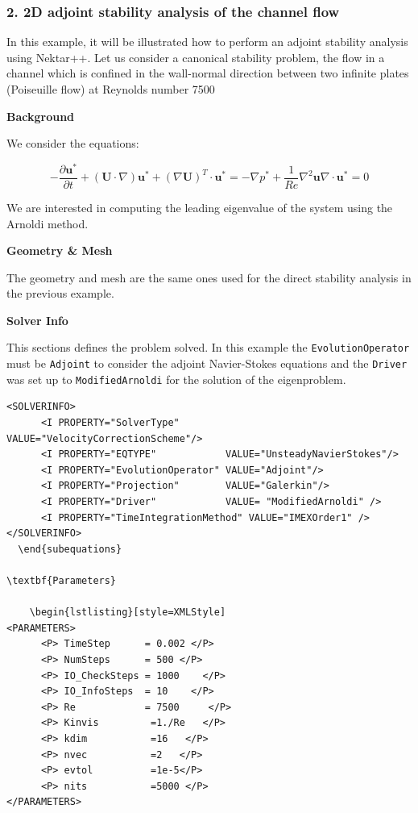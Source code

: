  \subsubsection{2. 2D adjoint stability analysis of the channel flow}

 In this example, it will be illustrated how to perform an adjoint stability analysis using Nektar++. Let us consider a canonical stability problem, the flow in a channel which is confined in the wall-normal direction between two infinite plates (Poiseuille flow) at Reynolds number 7500
 
 \textbf{Background}
 
  We consider the equations: 
  
  \begin{subequations}
  \begin{equation}
  -\frac{\partial \mathbf{u}^*}{\partial t}+(\mathbf{U} \cdot \nabla)\mathbf{u}^*+(\nabla \mathbf{U})^T \cdot \mathbf{u}^*=-\nabla p^*+\frac{1}{Re} \nabla^2 \mathbf{u}
  \end{equation}
  
  \begin{equation}
  \nabla \cdot \mathbf{u}^*=0
  \end{equation} 
  \end{subequations}
  
  We are interested in computing the leading eigenvalue of the system using the Arnoldi method.
  
 \textbf{Geometry \& Mesh}
 
 The geometry and mesh are the same ones used for the direct stability analysis in the previous example.
 
 \textbf{Solver Info}
 
 This sections defines the problem solved. In this example the \texttt{EvolutionOperator} must be \texttt{Adjoint} to consider the adjoint Navier-Stokes equations and the \texttt{Driver} was set up to \texttt{ModifiedArnoldi} for the solution of the eigenproblem. 

    \begin{lstlisting}[style=XMLStyle]
<SOLVERINFO>
      <I PROPERTY="SolverType"        VALUE="VelocityCorrectionScheme"/>
      <I PROPERTY="EQTYPE"            VALUE="UnsteadyNavierStokes"/>
      <I PROPERTY="EvolutionOperator" VALUE="Adjoint"/>
      <I PROPERTY="Projection"        VALUE="Galerkin"/>
      <I PROPERTY="Driver"            VALUE= "ModifiedArnoldi" />
      <I PROPERTY="TimeIntegrationMethod" VALUE="IMEXOrder1" />    
</SOLVERINFO>
  \end{subequations}

\textbf{Parameters}

    \begin{lstlisting}[style=XMLStyle]
<PARAMETERS>
      <P> TimeStep      = 0.002 </P>
      <P> NumSteps      = 500 </P>
      <P> IO_CheckSteps = 1000    </P>
      <P> IO_InfoSteps  = 10    </P>
      <P> Re            = 7500     </P>
      <P> Kinvis         =1./Re   </P>
      <P> kdim           =16   </P>
      <P> nvec           =2   </P>
      <P> evtol          =1e-5</P>
      <P> nits           =5000 </P>
</PARAMETERS>
  \end{lstlisting}

